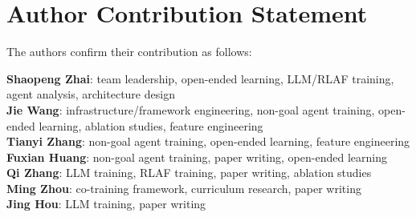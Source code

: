 \documentclass{article}
\theoremstyle{plain}
\theoremstyle{definition}
\theoremstyle{remark}
\begin{document}
\printAffiliationsAndNotice{\icmlEqualContribution} %









% 



\section*{Author Contribution Statement}
The authors confirm their contribution as follows:

\textbf{Shaopeng Zhai}: team leadership, open-ended learning, LLM/RLAF training, agent analysis, architecture design\\
\textbf{Jie Wang}: infrastructure/framework engineering, non-goal agent training, open-ended learning, ablation studies, feature engineering\\
\textbf{Tianyi Zhang}: non-goal agent training, open-ended learning, feature engineering\\
\textbf{Fuxian Huang}: non-goal agent training, paper writing, open-ended learning\\
\textbf{Qi Zhang}: LLM training, RLAF training, paper writing, ablation studies\\
\textbf{Ming Zhou}: co-training framework, curriculum research, paper writing\\
\textbf{Jing Hou}: LLM training, paper writing



\appendix
\onecolumn


% 
\end{document}
